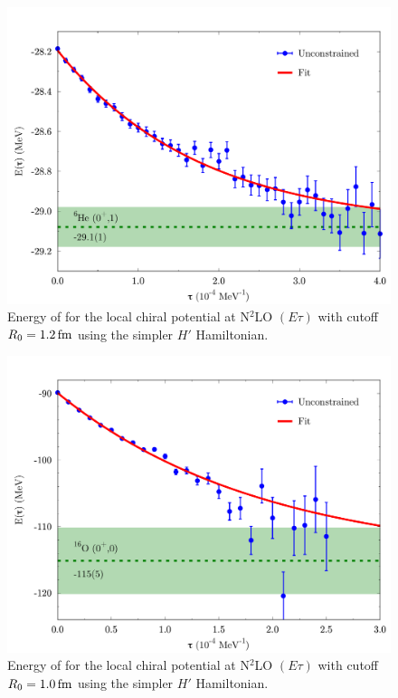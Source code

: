 \documentclass[aps,prc,twocolumn,superscriptaddress,floatfix]{revtex4-1}
\begin{document}
\begin{figure}[htb]
\includegraphics[width=\linewidth]{tr_he6.pdf}
\caption[]{Energy of  for the local chiral potential at
N$^2$LO $(E\tau)$ with cutoff $R_0=1.2\,\rm fm$ using the simpler $H'$ Hamiltonian.}
\label{fig:tr_he6}
\end{figure}

\begin{figure}[htb]
\includegraphics[width=\linewidth]{tr_o16.pdf}
\caption[]{Energy of  for the local chiral potential at
N$^2$LO $(E\tau)$ with cutoff $R_0=1.0\,\rm fm$ using the simpler $H'$ Hamiltonian.}
\label{fig:tr_o16}
\end{figure}
\end{document}
